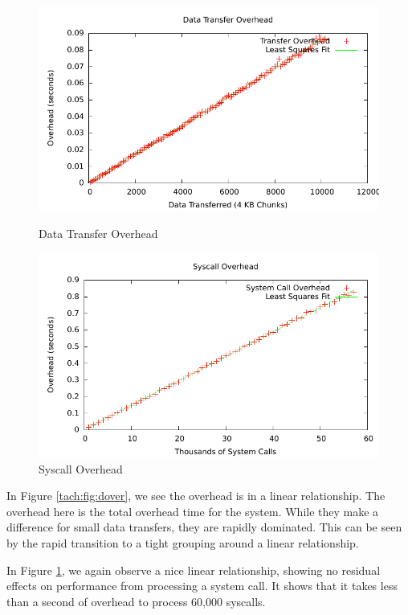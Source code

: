 \begin{figure}
\begin{minipage}[b]{0.49\linewidth}
\centering
\includegraphics[scale=0.5, trim=40mm 0mm 20mm  0mm]{tachyon/dataData.pdf}
\caption{Data Transfer Overhead}
\label{tach:fig:dover}
\end{minipage}\begin{minipage}[b]{0.49\linewidth}
\centering
\includegraphics[scale=0.5]{tachyon/sysData.pdf}
\caption{Syscall Overhead}
\label{tach:fig:sover}
\end{minipage}
\end{figure}

In Figure \ref{tach:fig:dover}, we see the overhead is in a linear relationship.
The overhead here is the total overhead
time for the system. While they make a difference for small data transfers, they are
rapidly dominated. This can be seen by the rapid transition to a tight grouping
around a linear relationship.


In Figure \ref{tach:fig:sover}, we again observe a nice linear relationship, showing no residual effects on performance from processing a system call. It shows that it takes less than a second of overhead to process 60,000 syscalls.


